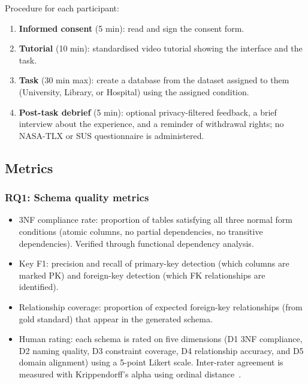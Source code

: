 \documentclass[11pt,a4paper]{article}
\begin{document}
Procedure for each participant:
\begin{enumerate}
  \item \textbf{Informed consent} (5 min): read and sign the consent form.
  \item \textbf{Tutorial} (10 min): standardised video tutorial showing the interface and the task.
  \item \textbf{Task} (30 min max): create a database from the dataset assigned to them (University, Library, or Hospital) using the assigned condition.
  \item \textbf{Post-task debrief} (5 min): optional privacy-filtered feedback, a brief interview about the experience, and a reminder of withdrawal rights; no NASA-TLX or SUS questionnaire is administered.
\end{enumerate}

\subsection{Metrics}

\subsubsection{RQ1: Schema quality metrics}
\begin{itemize}
  \item 3NF compliance rate: proportion of tables satisfying all three normal form conditions (atomic columns, no partial dependencies, no transitive dependencies). Verified through functional dependency analysis.
  \item Key F1: precision and recall of primary-key detection (which columns are marked PK) and foreign-key detection (which FK relationships are identified).
  \item Relationship coverage: proportion of expected foreign-key relationships (from gold standard) that appear in the generated schema.
  \item Human rating: each schema is rated on five dimensions (D1 3NF compliance, D2 naming quality, D3 constraint coverage, D4 relationship accuracy, and D5 domain alignment) using a 5-point Likert scale. Inter-rater agreement is measured with Krippendorff's alpha using ordinal distance~\citep{krippendorff2018content}.
\end{itemize}
\end{document}
